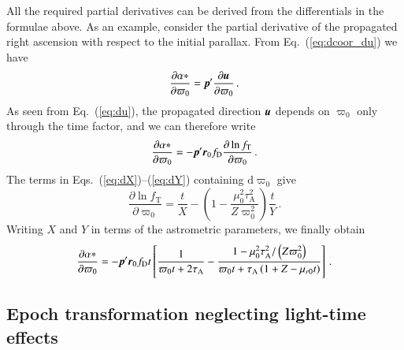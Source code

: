 \documentclass{aa}
\def\vec#1{\ensuremath{\mathchoice{\mbox{\boldmath$\displaystyle#1$}}
{\mbox{\boldmath$\textstyle#1$}}
{\mbox{\boldmath$\scriptstyle#1$}}
{\mbox{\boldmath$\scriptscriptstyle#1$}}}}
\begin{document}
All the required partial derivatives can be derived from the differentials in
the formulae above. As an example, consider the partial derivative of the
propagated right ascension with respect to the initial parallax. From
Eq.~(\ref{eq:dcoor_du}) we have
\begin{equation}
  \frac{\partial\alpha*}{\partial\varpi_0}=\vec{p}'\frac{\partial\vec{u}}{\partial\varpi_0}\,.
\end{equation}
As seen from Eq.~(\ref{eq:du}), the propagated direction $\vec{u}$ depends on $\varpi_0$ only through the time factor, and we can therefore write
\begin{equation}
  \frac{\partial\alpha*}{\partial\varpi_0}=
  -\vec{p}'\vec{r}_0f_\mathrm{D}\frac{\partial\ln f_\mathrm{T}}{\partial\varpi_0}\,.
\end{equation}
The terms in Eqs.~(\ref{eq:dX})--(\ref{eq:dY}) containing $\mathrm{d}\varpi_0$ give
\begin{equation}
  \frac{\partial\ln f_\mathrm{T}}{\partial\varpi_0}=\frac{t}{X}
  -\left(1-\frac{\mu_0^2\tau_\mathrm{A}^2}{Z\varpi_0^2}\right)\frac{t}{Y}\,.
\end{equation}
Writing $X$ and $Y$ in terms of the astrometric parameters, we finally obtain
\begin{equation}
  \frac{\partial\alpha*}{\partial\varpi_0}=
  -\vec{p}'\vec{r}_0f_\mathrm{D}t
  \left[\frac{1}{\varpi_0t+2\tau_\mathrm{A}}
  -\frac{1-\mu_0^2\tau_\mathrm{A}^2/\left(Z\varpi_0^2\right)}{\varpi_0t+\tau_\mathrm{A}\left(1+Z-\mu_{r0}t\right)}
  \right] \,.
\end{equation}

\subsection{Epoch transformation neglecting light-time
effects}\label{ss:neglecting}
\end{document}
